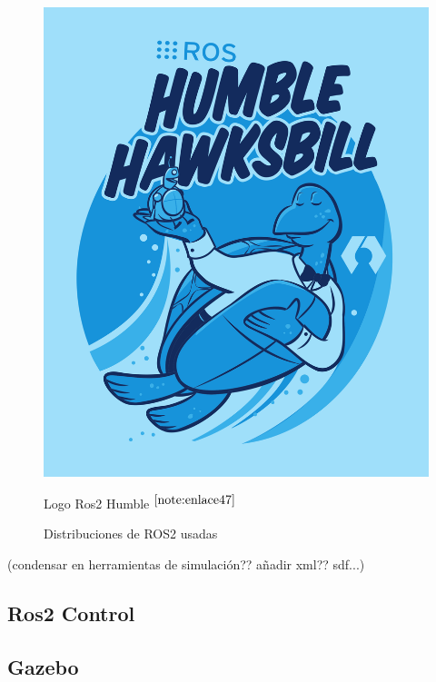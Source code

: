 \begin{figure}[ht!]
\begin{minipage}{0.35\linewidth}
		\includegraphics[width=\linewidth]{figs/humble.png}
		\caption*{\centering Logo Ros2 Humble $^{\ref{note:enlace47}}$} %
	\end{minipage}
	\caption{Distribuciones de ROS2 usadas}
	\label{fig:rosdis}
\end{figure}


\setcounter{footnote}{46} %

\setcounter{footnote}{47} %


(condensar en herramientas de simulación?? añadir xml?? sdf...)
\subsection{Ros2 Control}

\subsection{Gazebo}


